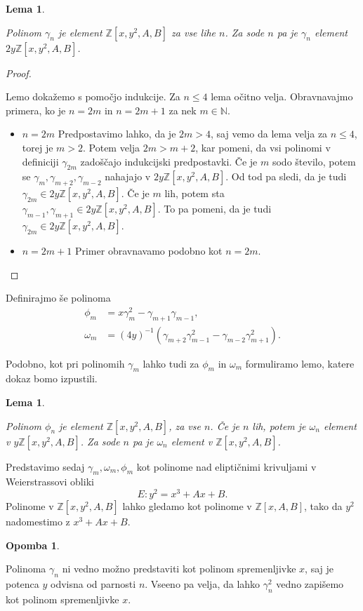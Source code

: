 \documentclass[12pt,a4paper,twoside]{article}
\theoremstyle{definition} %
\newtheorem{opomba}[definicija]{Opomba}
\theoremstyle{plain} %
\newtheorem{lema}[definicija]{Lema}
\numberwithin{equation}{section}  %
\newcommand{\N}{\mathbb N}
\newcommand{\Z}{\mathbb Z}
\begin{document}
\begin{lema}~

Polinom $\gamma_{n}$ je element $\Z[x,y^2,A,B]$ za vse lihe $n$.  Za sode $n$ pa je $\gamma_{n}$ element \newline $2y\Z[x,y^2,A,B]$.

\end{lema}

\begin{proof}~

Lemo dokažemo s pomočjo indukcije. Za $n \leq 4$ lema očitno velja. Obravnavajmo primera, ko je $n=2m$ in  $n=2m+1$ za nek $m\in\N$.
\begin{itemize}
\item{$n=2m$}
Predpostavimo lahko, da je $2m>4$, saj vemo da lema velja za $n\leq 4$, torej je $m>2$. Potem velja $2m>m+2$, kar pomeni, da vsi polinomi v definiciji $\gamma_{2m}$ zadoščajo indukcijski predpostavki. Če je $m$ sodo število, potem se $\gamma_{m},\gamma_{m+2},\gamma_{m-2}$ nahajajo v $2y\Z[x,y^2,A,B]$. Od tod pa sledi, da je tudi $\gamma_{2m} \in 2y\Z[x,y^2,A,B]$.
Če je $m$ lih, potem sta $\gamma_{m-1},\gamma_{m+1} \in 2y\Z[x,y^2,A,B]$. To pa pomeni, da je tudi  $\gamma_{2m} \in 2y\Z[x,y^2,A,B]$.
\item{$n=2m+1$}
Primer obravnavamo podobno kot $n=2m$.


\end{itemize}


\end{proof}

Definirajmo še polinoma
\begin{align}
\phi_m &{}=x\gamma^2_m-\gamma_{m+1}\gamma_{m-1}, \nonumber \\
\omega_m &{} = (4y)^{-1}(\gamma_{m+2}\gamma^2_{m-1}-\gamma_{m-2}\gamma^2_{m+1}). \nonumber
\end{align}

Podobno, kot pri polinomih $\gamma_m$ lahko tudi za $\phi_m$ in $\omega_m$ formuliramo lemo, katere dokaz bomo izpustili.

\begin{lema}~

Polinom $\phi_{n}$ je element $\Z[x,y^2,A,B]$, za vse $n$. Če je $n$ lih, potem je $\omega_{n}$ element v \newline $y\Z[x,y^2,A,B]$. Za sode $n$ pa je $\omega_{n}$ element v $\Z[x,y^2,A,B]$.

\end{lema}

Predstavimo sedaj $\gamma_m, \omega_m, \phi_m$ kot polinome nad eliptičnimi krivuljami v Weierstrassovi obliki
$$E: y^2=x^3+Ax+B.$$
Polinome v $\Z[x,y^2,A,B]$ lahko gledamo kot polinome v $\Z[x,A,B]$, tako da $y^2$ nadomestimo z $x^3+Ax+B$.
\begin{opomba}~

Polinoma $\gamma_n$ ni vedno možno predstaviti kot polinom spremenljivke $x$, saj je potenca $y$ odvisna od parnosti $n$. Vseeno pa velja, da lahko $\gamma^2_n$ vedno zapišemo kot polinom spremenljivke $x$.

\end{opomba}
\end{document}

